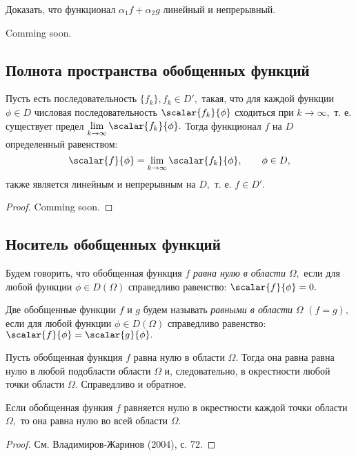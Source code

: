 \begin{task}
	Доказать, что функционал $\alpha_1 f + \alpha_2 g$ линейный и непрерывный.
\end{task}


\begin{solution}
	Comming soon.
\end{solution} 


\subsection{Полнота пространства обобщенных функций}
\begin{lemma}
Пусть есть последовательность $\{f_k\}, f_k \in D',$ такая, что для каждой функции $\phi \in D$ числовая последовательность $\scalar{f_k}{\phi}$ сходиться при $k \to \infty,$ т. е. существует предел $\lim\limits_{k \to \infty} \scalar{f_k}{\phi}.$ Тогда функционал $f$ на $D$ определенный равенством:
$$
\scalar{f}{\phi} = \lim_{k \to \infty} \scalar{f_k}{\phi}, \qquad \phi \in D,
$$
также является линейным и непрерывным на $D,$ т. е. $f \in D'.$
\end{lemma}
\begin{proof}
   Comming soon.
\end{proof} 

\subsection{Носитель обобщенных функций}
Будем говорить, что обобщенная функция $f$ \emph{равна нулю в области} $\Omega,$ если для любой функции $\phi \in D(\Omega)$ справедливо равенство: $\scalar{f}{\phi} = 0.$
 
Две обобщенные функции $f$ и $g$ будем называть \emph{равными в области} $\Omega$  $(f = g),$ если для любой функции $\phi \in D(\Omega)$ справедливо равенство: $\scalar{f}{\phi} = \scalar{g}{\phi}.$

Пусть обобщенная функция $f$ равна нулю в области $\Omega.$ Тогда она равна равна нулю в любой подобласти области $\Omega$ и, следовательно, в окрестности любой точки области $\Omega.$ Справедливо и обратное.
\begin{lemma}
Если обобщенная функия $f$ равняется нулю в окрестности каждой точки области $\Omega,$ то она равна нулю во всей области $\Omega.$  
\end{lemma}
\begin{proof}
   См. Владимиров-Жаринов (2004), с. 72.
\end{proof}

